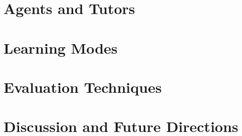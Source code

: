\documentclass{article}
\begin{document}
\section{Agents and Tutors}
\section{Learning Modes}
\section{Evaluation Techniques}
\section{Discussion and Future Directions}













\end{document}
